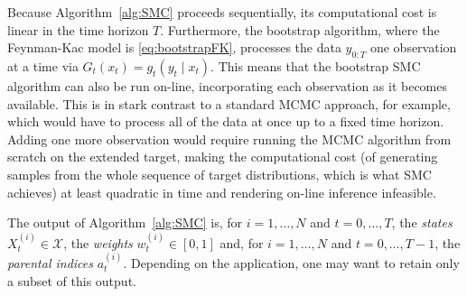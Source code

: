 Because Algorithm~\ref{alg:SMC} proceeds sequentially, its computational cost is linear in the time horizon $T$. Furthermore, the bootstrap algorithm, where the Feynman-Kac model is \eqref{eq:bootstrapFK}, processes the data $y_{0:T}$ one observation at a time via $G_t(x_t) = g_t(y_t \mid x_t)$. This means that the bootstrap SMC algorithm can also be run on-line, incorporating each observation as it becomes available.
This is in stark contrast to a standard MCMC approach, for example, which would have to process all of the data at once up to a fixed time horizon. Adding one more observation would require running the MCMC algorithm from scratch on the extended target, making the computational cost (of generating samples from the whole sequence of target distributions, which is what SMC achieves) at least quadratic in time and rendering on-line inference infeasible.

The output of Algorithm~\ref{alg:SMC} is, for $i=1,\dots, N$ and $t=0,\dots,T$, the \emph{states} $X_t^{(i)} \in \mathcal{X}$, the \emph{weights} $w_t^{(i)} \in [0,1]$ and, for $i=1,\dots, N$ and $t=0,\dots,T-1$, the \emph{parental indices} $a_t^{(i)}$.
Depending on the application, one may want to retain only a subset of this output.

